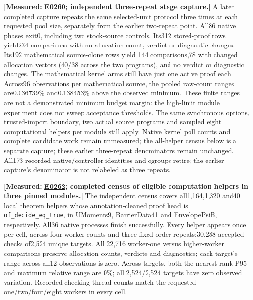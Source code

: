 \documentclass[10pt,twocolumn]{article}
\newcommand{\measured}[1]{\textbf{[Measured: #1]}}
\newcommand{\expref}[2]{\href{https://github.com/yunwei37/proofserve/blob/main/docs/tmp/build-and-evaluate/step-#1/step-report.md}{E#2}}
\begin{document}
\measured{\expref{0260-20261102T020415+0000}{0260}; independent three-repeat stage capture.}
A later completed capture repeats the same selected-unit protocol three
times at each requested pool size, separately from the earlier two-repeat
point. All86 native phases exit0, including two stock-source controls.
Its312 stored-proof rows yield234 comparisons with no allocation-count,
verdict or diagnostic changes. Its192 mathematical source-clone rows yield
144 comparisons,78 with changed allocation vectors (40/38 across the two
programs), and no verdict or diagnostic changes.
The mathematical kernel arms still have just one active proof each.
Across96 observations per mathematical source, the pooled raw-count ranges
are0.036739\% and0.138453\% above the observed minimum.
These finite ranges are not a demonstrated minimum budget margin:
the high-limit module experiment does not sweep acceptance thresholds.
The same synchronous options, trusted-import boundary, two actual source
programs and sampled eight computational helpers per module still apply.
Native kernel poll counts and complete candidate work remain unmeasured;
the all-helper census below is a separate capture; these earlier
three-repeat denominators remain unchanged.
All173 recorded native/controller identities and cgroups retire;
the earlier capture's denominator is not relabeled as three repeats.


\measured{\expref{0262-20261102T030442+0000}{0262}; completed census of eligible computation helpers in three pinned modules.}
The independent census covers all1,164,1,320 and40 local theorem helpers
whose annotation-cleaned proof head is \texttt{of\_decide\_eq\_true},
in UMoments9, BarrierData41 and EnvelopePsiB, respectively.
All36 native processes finish successfully.
Every helper appears once per cell, across four worker counts and three
fixed-order repeats:30,288 accepted checks of2,524 unique targets.
All 22,716 worker-one versus higher-worker comparisons preserve allocation
counts, verdicts and diagnostics; each target's range across all12
observations is zero. Across targets, both the nearest-rank P95 and maximum
relative range are 0\%; all 2,524/2,524 targets have zero observed variation. Recorded checking-thread counts match the requested
one/two/four/eight workers in every cell.
\end{document}
